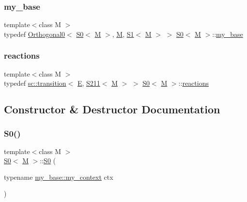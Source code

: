 \subsubsection{\texorpdfstring{my\+\_\+base}{my\_base}}
{\footnotesize\ttfamily template$<$class M $>$ \\
typedef \mbox{\hyperlink{struct_orthogonal0}{Orthogonal0}}$<$ \mbox{\hyperlink{struct_s0}{S0}}$<$ \mbox{\hyperlink{struct_m}{M}} $>$, \mbox{\hyperlink{struct_m}{M}}, \mbox{\hyperlink{struct_s1}{S1}}$<$ \mbox{\hyperlink{struct_m}{M}} $>$ $>$ \mbox{\hyperlink{struct_s0}{S0}}$<$ \mbox{\hyperlink{struct_m}{M}} $>$\+::\mbox{\hyperlink{struct_s0_ab6b77c5f26dece1481b89ddb3603750a}{my\+\_\+base}}}

\mbox{\label{struct_s0_a8dda440c194537ffcbfda3e92279905b}} 
\subsubsection{\texorpdfstring{reactions}{reactions}}
{\footnotesize\ttfamily template$<$class M $>$ \\
typedef \mbox{\hyperlink{classboost_1_1statechart_1_1transition}{sc\+::transition}}$<$ \mbox{\hyperlink{struct_e}{E}}, \mbox{\hyperlink{struct_s211}{S211}}$<$ \mbox{\hyperlink{struct_m}{M}} $>$ $>$ \mbox{\hyperlink{struct_s0}{S0}}$<$ \mbox{\hyperlink{struct_m}{M}} $>$\+::\mbox{\hyperlink{struct_s0_a8dda440c194537ffcbfda3e92279905b}{reactions}}}



\subsection{Constructor \& Destructor Documentation}
\mbox{\label{struct_s0_ae3f54303af3fc2ac9e5359ee234449df}} 
\subsubsection{\texorpdfstring{S0()}{S0()}}
{\footnotesize\ttfamily template$<$class M $>$ \\
\mbox{\hyperlink{struct_s0}{S0}}$<$ \mbox{\hyperlink{struct_m}{M}} $>$\+::\mbox{\hyperlink{struct_s0}{S0}} (\begin{DoxyParamCaption}\item[{typename \mbox{\hyperlink{struct_orthogonal0_a9e83fb13d36d05273364de4b3101f135}{my\+\_\+base\+::my\+\_\+context}}}]{ctx }\end{DoxyParamCaption})\hspace{0.3cm}{\ttfamily [inline]}}



